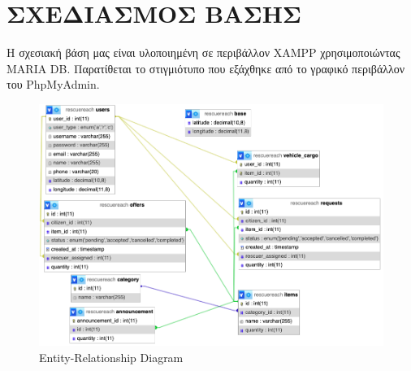 \chapter{ΣΧΕΔΙΑΣΜΟΣ ΒΑΣΗΣ}
    Η σχεσιακή βάση μας είναι υλοποιημένη σε περιβάλλον XAMPP χρησιμοποιώντας MARIA DB.
    Παρατίθεται το στιγμιότυπο που εξάχθηκε από το γραφικό περιβάλλον του PhpMyAdmin.

    \begin{figure}[h!] \noindent\centering
        \includegraphics[scale=0.45]{img/sxesiakivash}
        \caption{Entity-Relationship Diagram}
    \end{figure}
